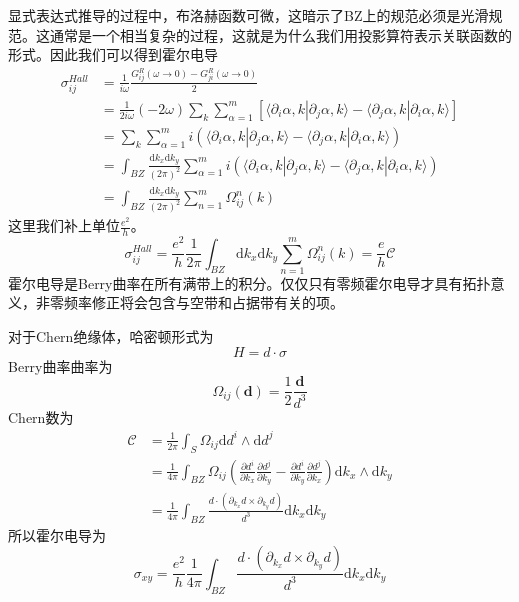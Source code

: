 \documentclass{article}
\numberwithin{equation}{subsection}
\begin{document}
显式表达式推导的过程中，布洛赫函数可微，这暗示了BZ上的规范必须是光滑规范。这通常是一个相当复杂的过程，这就是为什么我们用投影算符表示关联函数的形式。因此我们可以得到霍尔电导
\begin{equation}
    \begin{split}
        \sigma_{ij}^{Hall}&=\frac{1}{i\omega}\frac{G_{ij}^R(\omega\to0)-G_{ji}^R(\omega\to0)}{2}\\
        &=\frac{1}{2i\omega}(-2\omega)\sum_{k}\sum_{\alpha=1}^{m}[\langle\partial_i\alpha,k|\partial_j\alpha,k\rangle-\langle\partial_j\alpha,k|\partial_i\alpha,k\rangle]\\
        &=\sum_{k}\sum_{\alpha=1}^{m}i(\langle\partial_i\alpha,k|\partial_j\alpha,k\rangle-\langle\partial_j\alpha,k|\partial_i\alpha,k\rangle)\\
        &=\int_{BZ}\frac{\mathrm{d}k_x\mathrm{d}k_y}{(2\pi)^2}\sum_{\alpha=1}^{m}i(\langle\partial_i\alpha,k|\partial_j\alpha,k\rangle-\langle\partial_j\alpha,k|\partial_i\alpha,k\rangle)\\
        &=\int_{BZ}\frac{\mathrm{d}k_x\mathrm{d}k_y}{(2\pi)^2}\sum_{n=1}^{m}\Omega_{ij}^{n}(k)
    \end{split}
\end{equation}
这里我们补上单位$\frac{e^2}{h}$。
\begin{equation}
    \sigma_{ij}^{Hall}=\frac{e^2}{h}\frac{1}{2\pi}\int_{BZ}\mathrm{d}k_x\mathrm{d}k_y\sum_{n=1}^{m}\Omega_{ij}^n(k)=\frac{e}{h}\mathcal{C}
\end{equation}
霍尔电导是Berry曲率在所有满带上的积分。仅仅只有零频霍尔电导才具有拓扑意义，非零频率修正将会包含与空带和占据带有关的项。

对于Chern绝缘体，哈密顿形式为
\begin{equation}
    H=d\cdot\sigma
\end{equation}
Berry曲率曲率为
\begin{equation}
    \Omega_{ij}(\mathbf{d})=\frac{1}{2}\frac{\mathbf{d}}{d^3}
\end{equation}
Chern数为
\begin{equation}
    \begin{split}
        \mathcal{C}&=\frac{1}{2\pi}\int_{S}\Omega_{ij}\mathrm{d}d^i\wedge\mathrm{d}d^j\\
        &=\frac{1}{4\pi}\int_{BZ}\Omega_{ij}\left(\frac{\partial d^i}{\partial k_x}\frac{\partial d^j}{\partial k_y}-\frac{\partial d^i}{\partial k_y}\frac{\partial d^j}{\partial k_x}\right)\mathrm{d}k_x\wedge\mathrm{d}k_y\\
        &=\frac{1}{4\pi}\int_{BZ}\frac{d\cdot(\partial_{k_x}d\times \partial_{k_y}d)}{d^3}\mathrm{d}k_x\mathrm{d}k_y
    \end{split}
\end{equation}
所以霍尔电导为
\begin{equation}
    \sigma_{xy}=\frac{e^2}{h}\frac{1}{4\pi}\int_{BZ}\frac{d\cdot(\partial_{k_x}d\times \partial_{k_y}d)}{d^3}\mathrm{d}k_x\mathrm{d}k_y
\end{equation}
\end{document}
